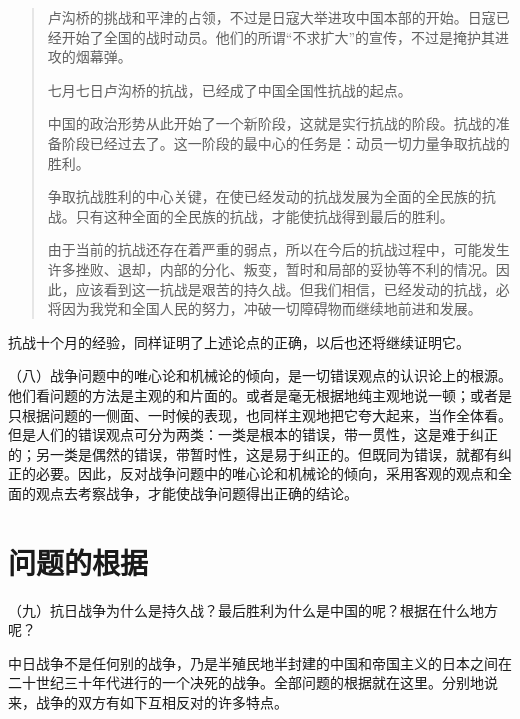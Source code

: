 \begin{quote}
卢沟桥的挑战和平津的占领，不过是日寇大举进攻中国本部的开始。日寇已经开始了全国的战时动员。他们的所谓“不求扩大”的宣传，不过是掩护其进攻的烟幕弹。

七月七日卢沟桥的抗战，已经成了中国全国性抗战的起点。

中国的政治形势从此开始了一个新阶段，这就是实行抗战的阶段。抗战的准备阶段已经过去了。这一阶段的最中心的任务是：动员一切力量争取抗战的胜利。

争取抗战胜利的中心关键，在使已经发动的抗战发展为全面的全民族的抗战。只有这种全面的全民族的抗战，才能使抗战得到最后的胜利。

由于当前的抗战还存在着严重的弱点，所以在今后的抗战过程中，可能发生许多挫败、退却，内部的分化、叛变，暂时和局部的妥协等不利的情况。因此，应该看到这一抗战是艰苦的持久战。但我们相信，已经发动的抗战，必将因为我党和全国人民的努力，冲破一切障碍物而继续地前进和发展。
\end{quote}

抗战十个月的经验，同样证明了上述论点的正确，以后也还将继续证明它。

（八）战争问题中的唯心论和机械论的倾向，是一切错误观点的认识论上的根源。他们看问题的方法是主观的和片面的。或者是毫无根据地纯主观地说一顿；或者是只根据问题的一侧面、一时候的表现，也同样主观地把它夸大起来，当作全体看。但是人们的错误观点可分为两类：一类是根本的错误，带一贯性，这是难于纠正的；另一类是偶然的错误，带暂时性，这是易于纠正的。但既同为错误，就都有纠正的必要。因此，反对战争问题中的唯心论和机械论的倾向，采用客观的观点和全面的观点去考察战争，才能使战争问题得出正确的结论。

\section{问题的根据}

（九）抗日战争为什么是持久战？最后胜利为什么是中国的呢？根据在什么地方呢？

中日战争不是任何别的战争，乃是半殖民地半封建的中国和帝国主义的日本之间在二十世纪三十年代进行的一个决死的战争。全部问题的根据就在这里。分别地说来，战争的双方有如下互相反对的许多特点。

